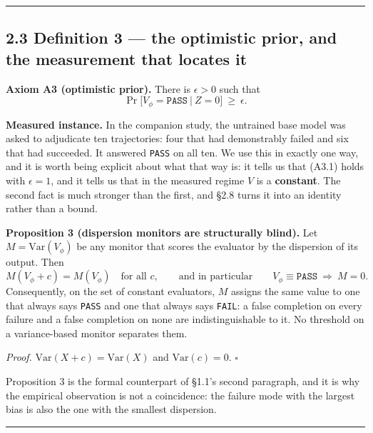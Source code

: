 \documentclass[11pt,a4paper]{article}
\newcounter{none}
\begin{document}
\begin{center}\rule{0.5\linewidth}{0.5pt}\end{center}

\subsection{2.3 Definition 3 --- the optimistic prior, and the measurement that locates it}\label{definition-3-the-optimistic-prior-and-the-measurement-that-locates-it}

\textbf{Axiom A3 (optimistic prior).} There is \(\epsilon>0\) such that
\begin{equation}
\Pr\big[V_\phi=\texttt{PASS}\ \big|\ Z=0\big]\ \ge\ \epsilon .
\tag{A3.1}
\end{equation}

\textbf{Measured instance.} In the companion study, the untrained base model was asked
to adjudicate ten trajectories: four that had demonstrably failed and six that had
succeeded. It answered \texttt{PASS} on all ten. We use this in exactly one way, and it
is worth being explicit about what that way is: it tells us that (A3.1) holds with
\(\epsilon=1\), and it tells us that in the measured regime \(V\) is a \textbf{constant}.
The second fact is much stronger than the first, and §2.8 turns it into an
identity rather than a bound.

\textbf{Proposition 3 (dispersion monitors are structurally blind).} Let
\(M=\mathrm{Var}(V_\phi)\) be any monitor that scores the evaluator by the
dispersion of its output. Then
\begin{equation}
M(V_\phi+c)=M(V_\phi)\quad\text{for all }c,
\qquad\text{and in particular}\qquad
V_\phi\equiv\texttt{PASS}\ \Rightarrow\ M=0 .
\tag{2.3.1}
\end{equation}
Consequently, on the set of constant evaluators, \(M\) assigns the same value to
one that always says \texttt{PASS} and one that always says \texttt{FAIL}: a false completion on
every failure and a false completion on none are indistinguishable to it. No
threshold on a variance-based monitor separates them.

\emph{Proof.} \(\mathrm{Var}(X+c)=\mathrm{Var}(X)\) and \(\mathrm{Var}(c)=0\). \(\square\)

Proposition 3 is the formal counterpart of §1.1's second paragraph, and it is
why the empirical observation is not a coincidence: the failure mode with the
largest bias is also the one with the smallest dispersion.

\begin{center}\rule{0.5\linewidth}{0.5pt}\end{center}
\end{document}
